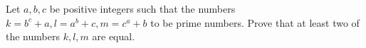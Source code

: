 Let $a,b,c$ be positive integers such that the numbers $k=b^c+a, l=a^b+c, m=c^a+b$ to be prime numbers. Prove that at least two of the numbers $k,l,m$ are equal.